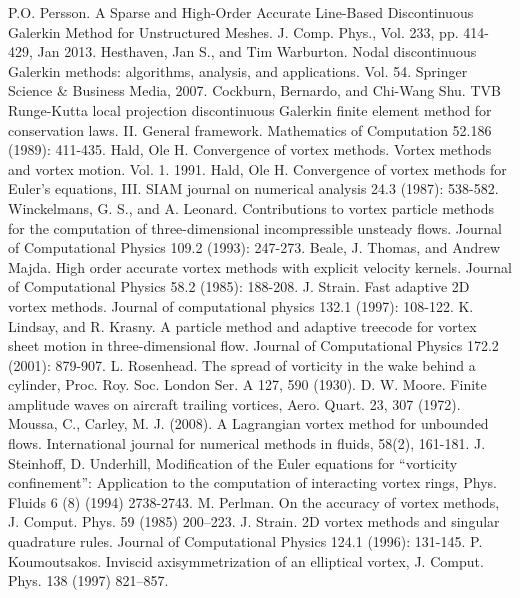 \documentclass[letterpaper,12pt]{report}
\begin{document}
\begin{thebibliography}{8}
P.O. Persson. A Sparse and High-Order Accurate Line-Based Discontinuous Galerkin Method for Unstructured Meshes. J. Comp. Phys., Vol. 233, pp. 414-429, Jan 2013.
Hesthaven, Jan S., and Tim Warburton. Nodal discontinuous Galerkin methods: algorithms, analysis, and applications. Vol. 54. Springer Science \& Business Media, 2007.
Cockburn, Bernardo, and Chi-Wang Shu. TVB Runge-Kutta local projection discontinuous Galerkin finite element method for conservation laws. II. General framework. Mathematics of Computation 52.186 (1989): 411-435.
Hald, Ole H. Convergence of vortex methods. Vortex methods and vortex motion. Vol. 1. 1991.
Hald, Ole H. Convergence of vortex methods for Euler's equations, III. SIAM journal on numerical analysis 24.3 (1987): 538-582.
Winckelmans, G. S., and A. Leonard. Contributions to vortex particle methods for the computation of three-dimensional incompressible unsteady flows. Journal of Computational Physics 109.2 (1993): 247-273.
Beale, J. Thomas, and Andrew Majda. High order accurate vortex methods with explicit velocity kernels. Journal of Computational Physics 58.2 (1985): 188-208.
J. Strain. Fast adaptive 2D vortex methods. Journal of computational physics 132.1 (1997): 108-122.
K. Lindsay, and R. Krasny. A particle method and adaptive treecode for vortex sheet motion in three-dimensional flow. Journal of Computational Physics 172.2 (2001): 879-907.
L. Rosenhead. The spread of vorticity in the wake behind a cylinder, Proc. Roy. Soc. London Ser. A 127, 590 (1930).
D. W. Moore. Finite amplitude waves on aircraft trailing vortices, Aero. Quart. 23, 307 (1972).
Moussa, C., Carley, M. J. (2008). A Lagrangian vortex method for unbounded flows. International journal for numerical methods in fluids, 58(2), 161-181.
J. Steinhoff, D. Underhill, Modification of the Euler equations for ``vorticity confinement'': Application to the computation of interacting vortex rings, Phys. Fluids 6 (8) (1994) 2738-2743.
M. Perlman. On the accuracy of vortex methods, J. Comput. Phys. 59 (1985) 200–223.
J. Strain. 2D vortex methods and singular quadrature rules. Journal of Computational Physics 124.1 (1996): 131-145.
P. Koumoutsakos. Inviscid axisymmetrization of an elliptical vortex, J. Comput. Phys. 138 (1997) 821–857.

\end{thebibliography}
\end{document}
